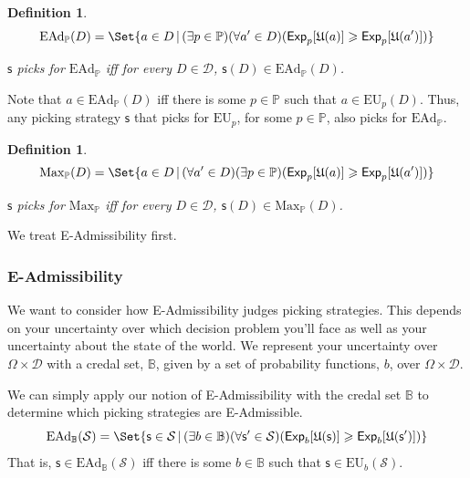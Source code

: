 \documentclass[a4paper,final]{article}
\newtheorem{definition}[theorem]{Definition}
\newtheorem{lemma}[theorem]{Lemma}
\renewcommand\P{\mathbb{P}} %
\newcommand\Exp{\mathsf{Exp}}
\newcommand\EU{\mathrm{EU}}
\newcommand\EAd{\mathrm{EAd}}
\newcommand\U{\mathfrak{U}} %
\newcommand\Maximality{\mathrm{Max}}
\newcommand{\D}{\mathcal{D}}
\renewcommand\S{\mathcal{S}}
\newcommand\s{\mathsf{s}}
\newcommand{\IB}{\mathbb{B}}
\newcommand{\IP}{\P}
\renewcommand{\color}[1]{}
\newenvironment{colored}[1]{\leavevmode\color{#1}}{}
\newcommand\SetDelimiter[1][]{
	\nonscript\,#1\vert \allowbreak \nonscript\,\mathopen{}}
\providecommand\given{\SetDelimiter}
\renewcommand{\geq}{\geqslant}
\newenvironment{CCM rewritten}
{\begingroup\color{blue}} %
{\endgroup}              %
\begin{document}
\begin{definition}\label{def:ead}
 $$\EAd_\IP(D) = \Set{a \in D \given (\exists p \in \IP)(\forall a' \in D)(\Exp_p[\U(a)]\geq\Exp_p[\U(a')])}$$
 
 	 $\s$ picks for $\EAd_\IP$ iff for every $D\in\D$, $\s(D)\in\EAd_\IP(D)$. 	
 \end{definition}

	 Note that	$a\in\EAd_\IP(D)$ iff there is some $p\in\IP$ such that $a\in\EU_p(D)$.  
Thus, any picking strategy $\s$ that picks for $\EU_p$, for some $p\in\IP$, also picks for $\EAd_\IP$.
	
	\begin{definition}
	$$\Maximality_\IP(D) = \Set{a \in D \given (\forall a'\in D)(\exists p\in\IP)(\Exp_p[\U(a)] \geq\Exp_p[\U(a')])}$$
	
		 $\s$ picks for $\Maximality_\IP$ iff for every $D\in\D$, $\s(D)\in\Maximality_\IP(D)$.
\end{definition}




We  treat E-Admissibility first. 
	
\subsubsection{E-Admissibility}

 
We want to consider how E-Admissibility judges picking strategies.  
This depends on your uncertainty over which decision problem you'll face as well as your uncertainty about the state of the world. 
We represent your uncertainty over $\Omega \times \D$ with a credal set, $\IB$, given by a set of probability functions, $b$, over $\Omega\times \D$. 

We can simply apply our notion of E-Admissibility with the credal set $\IB$ to determine which picking strategies are E-Admissible. 
 $$\EAd_\IB(\S)=\Set{\s\in\S\given  (\exists b \in \IB)(\forall \s' \in \S)(\Exp_b[\U(\s)]\geq\Exp_b[\U(\s')])}$$
That is, $\s\in\EAd_\IB(\S)$ iff there is some $b\in\IB$ such that $\s\in\EU_b(\S)$. 
%	
\end{document}
